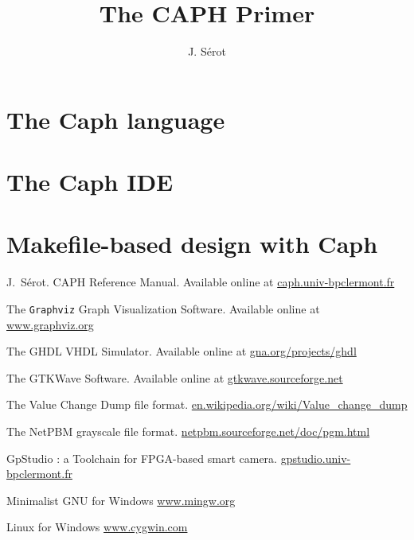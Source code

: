 \documentclass[A4]{report}
\title{The CAPH Primer}
\author{J. S\'erot}
\begin{document}
\maketitle



\part{The Caph language}
%



\part{The Caph IDE}




\part{Makefile-based design with Caph}






\begin{thebibliography}{1}

J.~S\'erot.
\newblock CAPH Reference Manual.
\newblock Available online at \url{caph.univ-bpclermont.fr}

\newblock The \texttt{Graphviz} Graph Visualization Software.
\newblock Available online at \url{www.graphviz.org}

\newblock The GHDL VHDL Simulator.
\newblock Available online at \url{gna.org/projects/ghdl}

\newblock The GTKWave Software.
\newblock Available online at \url{gtkwave.sourceforge.net}

\newblock The Value Change Dump file format.
\newblock \url{en.wikipedia.org/wiki/Value_change_dump}

\newblock The NetPBM grayscale file format.
\newblock \url{netpbm.sourceforge.net/doc/pgm.html}

\newblock GpStudio : a Toolchain for FPGA-based smart camera.
\newblock \url{gpstudio.univ-bpclermont.fr}

\newblock Minimalist GNU for Windows
\newblock \url{www.mingw.org}

\newblock Linux for Windows
\newblock \url{www.cygwin.com}

 
\end{thebibliography}
\tableofcontents
\end{document}
